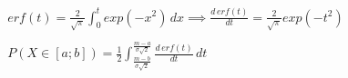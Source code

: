 \documentclass[preview]{standalone}
\begin{document}
\begin{align*}
erf(t) = { \frac{2}{\sqrt{\pi}} } \int_0^t { exp( -x^2 ) } \, dx \implies \frac{d \, erf(t)}{dt} = { \frac{2}{\sqrt{\pi}} } exp( -t^2 ) \\ \\ P( X \in [a;b] ) = { \frac{1}{2} } \int_{ \frac{m - b}{\sigma \sqrt{2}} }^{ \frac{m - a}{\sigma \sqrt{2}} } { { \frac{d \, erf(t)}{dt} } } \, dt
\end{align*}
\end{document}
